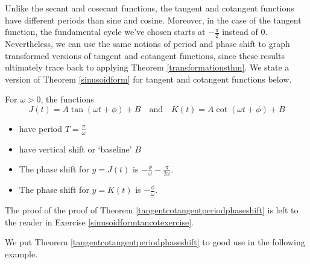 \documentclass{ximera}
\begin{document}
Unlike the secant and cosecant functions, the tangent and cotangent functions have different periods than sine and cosine.  Moreover,  in the case of the tangent function, the fundamental cycle we've chosen starts at $-\frac{\pi}{2}$ instead of $0$.  Nevertheless, we can use the same notions of period and phase shift to graph transformed versions of tangent and cotangent functions, since these results ultimately trace back to applying Theorem \ref{transformationsthm}.  We state a version of Theorem \ref{sinusoidform} for tangent and cotangent functions below. 




\begin{theorem}  \label{tangentcotangentperiodphaseshift} For $\omega > 0$, the functions \[J(t) = A \tan(\omega t + \phi) + B \quad \text{and} \quad K(t) = A \cot(\omega t + \phi) + B  \]

\begin{itemize}

\item  have period  $T = \frac{\pi}{\omega}$

\item  have vertical shift or `baseline'  $B$

\end{itemize}

\begin{itemize}

\item  The phase shift for $y = J(t)$ is $-\frac{\phi}{\omega} - \frac{\pi}{2 \omega}$.

\item  The phase shift for $y = K(t)$ is $-\frac{\phi}{\omega}$.

\end{itemize}

\end{theorem}







The proof of  the proof of  Theorem \ref{tangentcotangentperiodphaseshift} is left to the reader in Exercise \ref{sinusoidformtancotexercise}.  



We put Theorem \ref{tangentcotangentperiodphaseshift} to good use in the following example.
\end{document}
